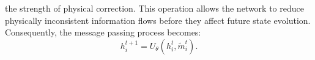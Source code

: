 the strength of physical correction. This operation allows the network to reduce physically inconsistent information flows before they affect future state evolution. Consequently, the message passing process becomes: \begin{equation} h_i^{t+1} = U_{\theta} ( h_i^t, \tilde{m}_i^t ). \end{equation} %